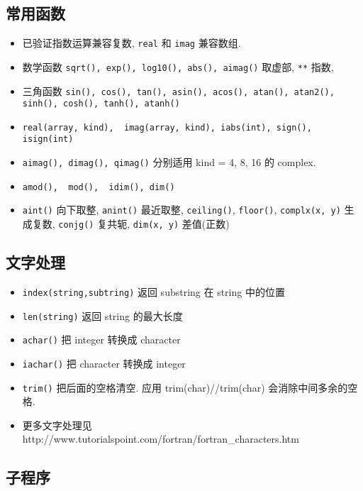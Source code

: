 \subsection{常用函数}
\begin{itemize}
\item 已验证指数运算兼容复数, \verb`real` 和 \verb`imag` 兼容数组.
\item 数学函数 \verb`sqrt(), exp(), log10(), abs(), aimag()` 取虚部, \verb`**` 指数, 
\item 三角函数 \verb`sin(), cos(), tan(), asin(), acos(), atan(), atan2(), sinh(), cosh(), tanh(), atanh()`
\item \verb`real(array, kind),  imag(array, kind), iabs(int), sign(), isign(int)`
\item \verb`aimag(), dimag(), qimag()` 分别适用 kind = 4, 8, 16 的 complex.
\item \verb`amod(),  mod(),  idim(), dim()`
\item \verb`aint()` 向下取整, \verb`anint()` 最近取整, \verb`ceiling()`, \verb`floor()`, \verb`complx(x, y)` 生成复数, \verb`conjg()` 复共轭, \verb`dim(x, y)` 差值(正数)
\end{itemize}

\subsection{文字处理}
\begin{itemize}
\item \verb`index(string,subtring)` 返回 substring 在 string 中的位置
\item \verb`len(string)` 返回 string 的最大长度
\item \verb`achar()` 把 integer 转换成 character
\item \verb`iachar()` 把 character 转换成 integer
\item \verb`trim()` 把后面的空格清空. 应用  trim(char)//trim(char) 会消除中间多余的空格.
\item 更多文字处理见 http://www.tutorialspoint.com/fortran/fortran_characters.htm
\end{itemize}

\subsection{子程序}
